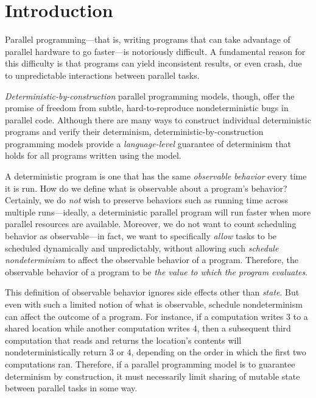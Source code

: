 \chapter{Introduction}\label{ch:intro} %


Parallel programming---that is, writing programs that can take
advantage of parallel hardware to go faster---is notoriously
difficult.  A fundamental reason for this difficulty is that programs
can yield inconsistent results, or even crash, due to unpredictable
interactions between parallel tasks.

\emph{Deterministic-by-construction} parallel programming models,
though, offer the promise of freedom from subtle, hard-to-reproduce
nondeterministic bugs in parallel code. Although there are many ways to
construct individual deterministic programs and verify their
determinism, deterministic-by-construction programming models provide
a \emph{language-level} guarantee of determinism
that holds for all programs written using the model.

A deterministic program is one that has the same \emph{observable
  behavior} every time it is run.  How do we define what is observable
about a program's behavior?  Certainly, we do \emph{not} wish to
preserve behaviors such as running time across multiple
runs---ideally, a deterministic parallel program will run faster when
more parallel resources are available.  Moreover, we do not want to
count scheduling behavior as observable---in fact, we want to
specifically \emph{allow} tasks to be scheduled dynamically and
unpredictably, without allowing such \emph{schedule nondeterminism} to
affect the observable behavior of a program.  Therefore,  the observable behavior of a program to be
\emph{the value to which the program evaluates}.


This definition of observable behavior ignores side effects other than
\emph{state}.  But even with such a limited notion of what is
observable, schedule nondeterminism can affect the outcome of a
program.  For instance, if a computation writes $3$ to a shared
location while another computation writes $4$, then a subsequent third
computation that reads and returns the location's contents will
nondeterministically return $3$ or $4$, depending on the order in
which the first two computations ran.  Therefore, if a parallel
programming model is to guarantee determinism by construction, it must
necessarily limit sharing of mutable state between parallel tasks in
some way.

